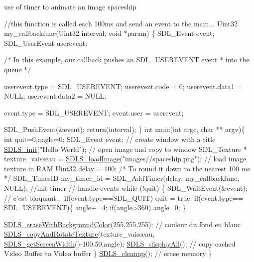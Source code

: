 use of timer to animate an image spaceship 
\begin{DoxyCode}
  \textcolor{comment}{//this function is called each 100ms and send an event to the main...}
  Uint32 my\_callbackfunc(Uint32 interval, \textcolor{keywordtype}{void} *param)
  \{
    SDL\_Event event;
    SDL\_UserEvent userevent;
 
      \textcolor{comment}{/* In this example, our callback pushes an SDL\_USEREVENT event}
\textcolor{comment}{*    into the queue */}
 
    userevent.type = SDL\_USEREVENT;
    userevent.code = 0;
    userevent.data1 = NULL;
    userevent.data2 = NULL;
 
    \textcolor{keyword}{event}.type = SDL\_USEREVENT;
    \textcolor{keyword}{event}.user = userevent;
 
    SDL\_PushEvent(&event);
    \textcolor{keywordflow}{return}(interval);
  \}
  \textcolor{keywordtype}{int} main(\textcolor{keywordtype}{int} argc, \textcolor{keywordtype}{char} ** argv)\{
   \textcolor{keywordtype}{int} quit=0,angle=0;
   SDL\_Event event;
  \textcolor{comment}{// create window with a title}
   \hyperlink{_s_d_l_s_8c_a75205531dbfd4d3a3166e245227b9c12}{SDLS\_init}(\textcolor{stringliteral}{"Hello World"});
  \textcolor{comment}{// open image and copy to window}
   SDL\_Texture * texture\_vaisseau = \hyperlink{_s_d_l_s_8c_ad6c27fd6e5502847ca73fb30f990cf0a}{SDLS\_loadImage}(\textcolor{stringliteral}{"images//spaceship.png"}); \textcolor{comment}{// load image
       texture in RAM}
   Uint32 delay = 100;  \textcolor{comment}{/* To round it down to the nearest 100 ms */}
   SDL\_TimerID my\_timer\_id = SDL\_AddTimer(delay, my\_callbackfunc, NULL); \textcolor{comment}{//init timer}
  \textcolor{comment}{// handle events}
   \textcolor{keywordflow}{while} (!quit)
   \{
      SDL\_WaitEvent(&event); \textcolor{comment}{// c'est bloquant...}
      \textcolor{keywordflow}{if}(event.type==SDL\_QUIT)
        quit = \textcolor{keyword}{true};
      \textcolor{keywordflow}{if}(event.type== SDL\_USEREVENT)\{
         angle+=4;
         \textcolor{keywordflow}{if}(angle>360)
              angle=0;  
      \}
  
   
     \hyperlink{_s_d_l_s_8c_aa0cca2ad329a916f149af068671bac0c}{SDLS\_eraseWithBackgroundColor}(255,255,255); \textcolor{comment}{// couleur du fond en blanc}
     \hyperlink{_s_d_l_s_8c_ac3b4e61ce8e03159ecd5894f1495e221}{SDLS\_copyAndRotateTexture}(texture\_vaisseau,
      \hyperlink{_s_d_l_s_8c_af8e50bb4d9c1087d9edfc6b68924f3f8}{SDLS\_getScreenWidth}()-100,50,angle);
     \hyperlink{_s_d_l_s_8c_a139692381ca40eb058ee477b4f561189}{SDLS\_displayAll}(); \textcolor{comment}{// copy cached Video Buffer to Video buffer}
   \}
   \hyperlink{_s_d_l_s_8c_aacc824d008ac615b82cc715c567ff91a}{SDLS\_cleanup}();  \textcolor{comment}{// erase memory}
  \}
\end{DoxyCode}
 